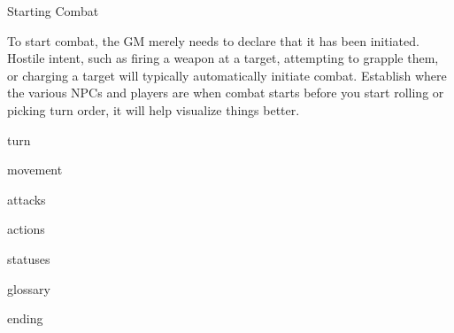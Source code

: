                                               Starting Combat

To start combat, the GM merely needs to declare that it has been initiated. Hostile intent, such
as firing a weapon at a target, attempting to grapple them, or charging a target will typically
automatically initiate combat. Establish where the various NPCs and players are when combat
starts before you start rolling or picking turn order, it will help visualize things better.

{turn}

{movement}

{attacks}

{actions}

{statuses}

{glossary}

{ending}
